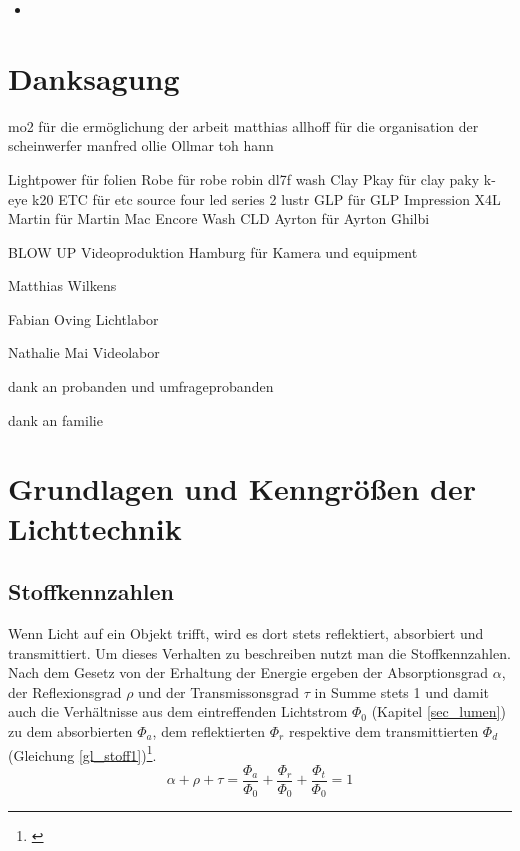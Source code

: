 \begin{itemize}
  \item 
  \end{itemize}  

\chapter{Danksagung}

mo2 für die ermöglichung der arbeit
matthias allhoff für die organisation der scheinwerfer
manfred ollie Ollmar
toh hann

Lightpower für folien
Robe für robe robin dl7f wash
Clay Pkay für clay paky k-eye k20
ETC für etc source four led series 2 lustr
GLP für GLP Impression X4L
Martin für Martin Mac Encore Wash CLD
Ayrton für Ayrton Ghilbi

BLOW UP Videoproduktion Hamburg für Kamera und equipment

Matthias Wilkens

Fabian Oving Lichtlabor

Nathalie Mai Videolabor

dank an probanden und umfrageprobanden

dank an familie




\chapter{Grundlagen und Kenngrößen der Lichttechnik} \label{chap_grundlagen}

\section{Stoffkennzahlen}
Wenn Licht auf ein Objekt trifft, wird es dort stets reflektiert, absorbiert und transmittiert. Um dieses Verhalten zu beschreiben nutzt man die Stoffkennzahlen. Nach dem Gesetz von der Erhaltung der Energie ergeben der Absorptionsgrad $\alpha$, der Reflexionsgrad $\rho$ und der Transmissonsgrad $\tau$ in Summe stets 1 und damit auch die Verhältnisse aus dem eintreffenden Lichtstrom $\Phi_{0}$ (Kapitel \ref{sec_lumen}) zu dem absorbierten $\Phi_{a}$, dem reflektierten $\Phi_{r}$ respektive dem transmittierten $\Phi_{d}$ (Gleichung \ref{gl_stoff1})\footnote{\cite[38]{hentschel}}.
\begin{equation}\label{gl_stoff1}
	\alpha + \rho + \tau = \frac{\Phi_{a}}{\Phi_{0}} + \frac{\Phi_{r}}{\Phi_{0}} + \frac{\Phi_{t}}{\Phi_{0}} = 1	
\end{equation}

